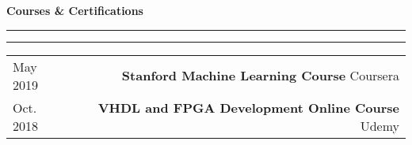 \documentclass{article}
\newcommand{\mainitem}[3] {
    \textbf{#1}  \newline #2 \vskip5pt  \textit{#3} 
    \vspace{6pt}    %
}
\newenvironment{cvtable} {
	\hspace{-20pt} \begin{tabular}{L!{\color{line_color}\vrule width 1pt}D} %
} 
{\end{tabular}}
\renewcommand{\section}[1] {
    \vspace{15pt}   %
	{\color{main_color} \Large \textbf {#1}}
	{\color{line_color} \vskip-5pt \rule{\linewidth}{0.5mm}\hfill\vskip-11pt\rule{\linewidth}{0.2pt}}
	\vskip10pt  %
}
\begin{document}
    \section{\textbf{Courses \& Certifications}}
        \begin{cvtable}
     		May 2019 &
     	        \mainitem
     	            {Stanford Machine Learning Course}
     	            {Coursera} 
     	            {
     	            \vspace{-20pt}
    				} 
    		\\
     		Oct. 2018 &
     	        \mainitem
     	            {VHDL and FPGA Development Online Course}
     	            {Udemy}
     	            {
     	            \vspace{-20pt}
    				}
    	\end{cvtable}
\end{document}
